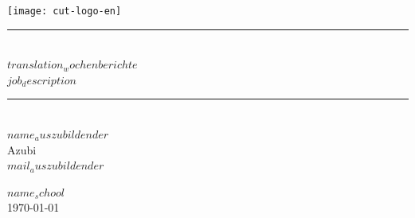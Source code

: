 \documentclass[11pt,a4paper]{article}
\newcommand{\HRule}{\rule{\linewidth}{0.5mm}}
\begin{document}
\begin{titlepage}
\begin{center}
  \texttt{[image: cut-logo-en]}~\\[2cm]


  \HRule \\[0.4cm]
  { \LARGE 
    \textbf{$translation_wochenberichte$}\\[0.4cm]
    \emph{$job_description$}\\[0.4cm]
  }
  \HRule \\[1.5cm]



  { \large
    $name_auszubildender$ \\[0.1cm]
    Azubi\\[0.1cm]
    \texttt{$mail_auszubildender$}
  }

  \vfill

  \textsc{\large $name_school$}\\[0.4cm]


  {\large \today}
  
  \end{center}
  \end{titlepage}

  \newpage

  \begin{abstract}
  
    $translation_disclaimer$

  \end{abstract}

  \newpage



  \tableofcontents
  \newpage
  \setcounter{page}{1}


  


  \newpage
\end{document}
